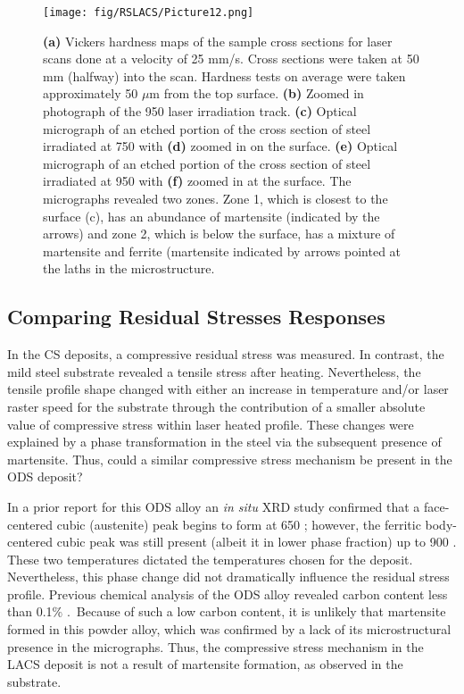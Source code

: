		\begin{figure}
			\centering
			\texttt{[image: fig/RSLACS/Picture12.png]}
			\caption[Vickers hardness maps and micrographs of etched samples of the  cross sections for laser scans done at a velocity of 25 mm/s.]{\textbf{(a)} Vickers hardness maps of the sample cross sections for laser scans done at a velocity of 25 mm/s. Cross sections were taken at 50 mm (halfway) into the scan. Hardness tests on average were taken approximately 50 $ \mu$m from the top surface. \textbf{(b) }Zoomed in photograph of the 950 \celsius{} laser irradiation track. \textbf{(c)} Optical micrograph of an etched portion of the cross section of steel irradiated at 750 \celsius{} with \textbf{(d)} zoomed in on the surface. \textbf{(e)} Optical micrograph of an etched portion of the cross section of steel irradiated at 950 \celsius{} with \textbf{(f)} zoomed in at the surface. The micrographs revealed two zones. Zone 1, which is closest to the surface (c), has an abundance of martensite (indicated by the arrows) and zone 2, which is below the surface, has a mixture of martensite and ferrite (martensite indicated by arrows pointed at the laths in the microstructure.}
			\label{fig:RSLACS12}
		\end{figure}
	
	
	
	\subsection*{Comparing Residual Stresses Responses}
	
	
		In the CS deposits, a compressive residual stress was measured.  In contrast, the mild steel substrate revealed a tensile stress after heating. Nevertheless, the tensile profile shape changed with either an increase in temperature and/or laser raster speed for the substrate through the contribution of a smaller absolute value of compressive stress within laser heated profile. These changes were explained by a phase transformation in the steel via the subsequent presence of martensite. Thus, could a similar compressive stress mechanism be present in the ODS deposit?
		
		
		In a prior report for this ODS alloy \cite{RN550} an \textit{in situ} XRD study confirmed that a face-centered cubic (austenite) peak begins to form at 650 \celsius{}; however, the ferritic body-centered cubic peak was still present (albeit it in lower phase fraction) up to 900 \celsius{}. These two temperatures dictated the temperatures chosen for the deposit. Nevertheless, this phase change did not dramatically influence the residual stress profile. Previous chemical analysis of the ODS alloy revealed carbon content less than 0.1$\%$ \cite{RN267}.\ Because of such a low carbon content, it is unlikely that martensite formed in this powder alloy, which was confirmed by a lack of its microstructural presence in the micrographs.  Thus, the compressive stress mechanism in the LACS deposit is not a result of martensite formation, as observed in the substrate. 
		
